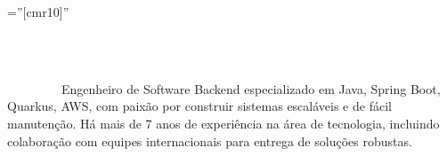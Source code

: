 \documentclass[a4paper,12pt]{article}
\begin{document}

\pagestyle{empty} %

\font\fb=''[cmr10]'' %

\par{
    \\
    \textcolor{white}{\tiny\textbf{Contato}}\\
\par}

\noindent{}

{\textcolor{white}{\tiny\textbf{Resumo}}
\justify
\noindent
{\normalsize Engenheiro de Software Backend especializado em Java, Spring Boot, Quarkus, AWS, com paixão por construir sistemas escaláveis e de fácil manutenção. Há mais de 7 anos de experiência na área de tecnologia, incluindo colaboração com equipes internacionais para entrega de soluções robustas.}}
\end{document}
